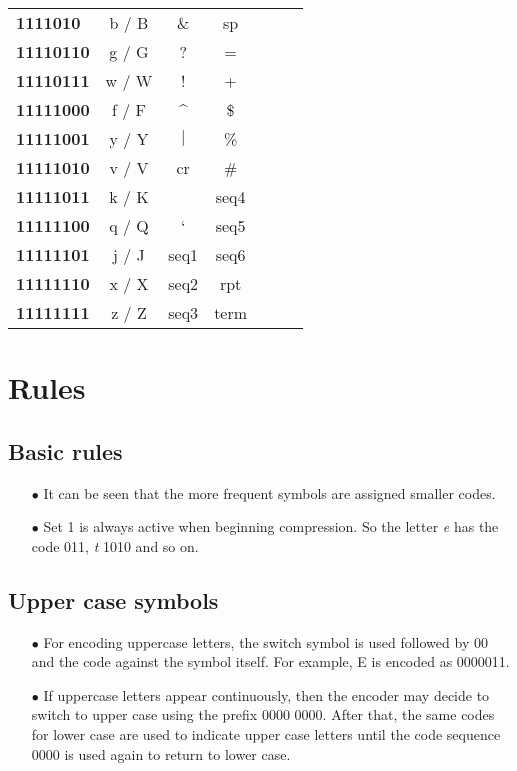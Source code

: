 \documentclass[]{article}
\begin{document}
\begin{center}
\begin{tabular}{ | l | c | c | c | c | c | c | }
		\textbf{1111010} & b / B & \& & sp & & \\ \cline{1-4}
		\textbf{11110110} & g / G & ? & = & & \\ \cline{1-4}
		\textbf{11110111} & w / W & ! & + & & \\ \cline{1-4}
		\textbf{11111000} & f / F & \^{} & \$ & & \\ \cline{1-4}
		\textbf{11111001} & y / Y & $|$ & \% & & \\ \cline{1-4}
		\textbf{11111010} & v / V & cr & \# & & \\ \cline{1-4}
		\textbf{11111011} & k / K & ~ & seq4 & & \\ \cline{1-4}
		\textbf{11111100} & q / Q & ` & seq5 & & \\ \cline{1-4}
		\textbf{11111101} & j / J & seq1 & seq6 & & \\ \cline{1-4}
		\textbf{11111110} & x / X & seq2 & rpt & & \\ \cline{1-4}
		\textbf{11111111} & z / Z & seq3 & term & & \\ \hline
	\end{tabular}
\end{center}

\section{Rules}

\subsection{Basic rules}
\begin{itemize}
	\item[$\bullet$] It can be seen that the more frequent symbols are assigned smaller codes.
	\item[$\bullet$] Set 1 is always active when beginning compression.  So the letter \emph{e} has the code 011, \emph{t} 1010 and so on.
\end{itemize}

\subsection{Upper case symbols}
\begin{itemize}
	\item[$\bullet$] For encoding uppercase letters, the switch symbol is used followed by 00 and the code against the symbol itself.  For example, E is encoded as 0000011.
	\item[$\bullet$] If uppercase letters appear continuously, then the encoder may decide to switch to upper case using the prefix 0000 0000.  After that, the same codes for lower case are used to indicate upper case letters until the code sequence 0000 is used again to return to lower case.
\end{itemize}
\end{document}
